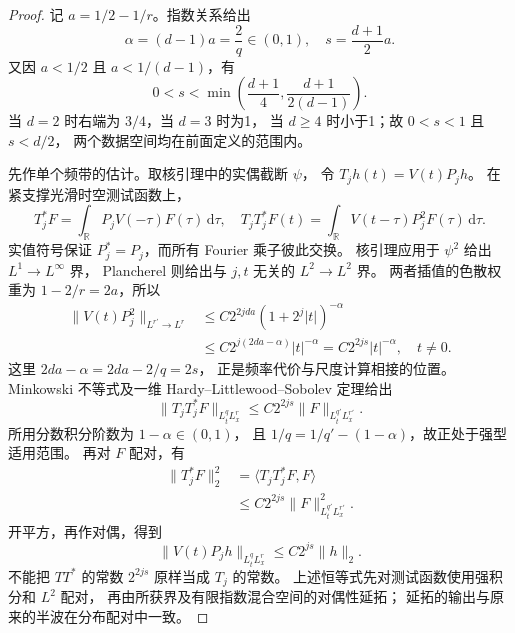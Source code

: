 \begin{proof}
记 \(a=1/2-1/r\)。指数关系给出
\[
 \alpha=(d-1)a=\frac2q\in(0,1),
 \quad
 s=\frac{d+1}{2}a.
\]
又因 \(a<1/2\) 且 \(a<1/(d-1)\)，有
\[
 0<s<\min\left(\frac{d+1}{4},\frac{d+1}{2(d-1)}\right).
\]
当 \(d=2\) 时右端为 \(3/4\)，当 \(d=3\) 时为1，
当 \(d\ge4\) 时小于1；故 \(0<s<1\) 且 \(s<d/2\)，
两个数据空间均在前面定义的范围内。

先作单个频带的估计。取核引理中的实偶截断 \(\psi\)，
令 \(T_jh(t)=V(t)P_jh\)。
在紧支撑光滑时空测试函数上，
\[
 T_j^*F=\int_{\mathbb R}P_jV(-\tau)F(\tau)\,\mathrm d\tau,
 \quad
 T_jT_j^*F(t)=
 \int_{\mathbb R}V(t-\tau)P_j^2F(\tau)\,\mathrm d\tau.
\]
实值符号保证 \(P_j^*=P_j\)，而所有 Fourier 乘子彼此交换。
核引理应用于 \(\psi^2\) 给出 \(L^1\to L^\infty\) 界，
Plancherel 则给出与 \(j,t\) 无关的 \(L^2\to L^2\) 界。
两者插值的色散权重为 \(1-2/r=2a\)，所以
\[
 \begin{aligned}
 \|V(t)P_j^2\|_{L^{r'}\to L^r}
 &\le C2^{2jda}(1+2^j|t|)^{-\alpha}\\
 &\le C2^{j(2da-\alpha)}|t|^{-\alpha}
 =C2^{2js}|t|^{-\alpha},
 \quad t\ne0.
 \end{aligned}
\]
这里 \(2da-\alpha=2da-2/q=2s\)，
正是频率代价与尺度计算相接的位置。
Minkowski 不等式及一维 Hardy--Littlewood--Sobolev 定理给出
\[
 \|T_jT_j^*F\|_{L^q_tL^r_x}
 \le C2^{2js}\|F\|_{L^{q'}_tL^{r'}_x}.
\]
所用分数积分阶数为 \(1-\alpha\in(0,1)\)，
且 \(1/q=1/q'-(1-\alpha)\)，故正处于强型适用范围。
再对 \(F\) 配对，有
\[
 \begin{aligned}
 \|T_j^*F\|_2^2
 &=\langle T_jT_j^*F,F\rangle\\
 &\le C2^{2js}\|F\|_{L^{q'}_tL^{r'}_x}^2.
 \end{aligned}
\]
开平方，再作对偶，得到
\[
 \|V(t)P_jh\|_{L^q_tL^r_x}\le C2^{js}\|h\|_2.
\]
不能把 \(TT^*\) 的常数 \(2^{2js}\) 原样当成 \(T_j\) 的常数。
上述恒等式先对测试函数使用强积分和 \(L^2\) 配对，
再由所获界及有限指数混合空间的对偶性延拓；
延拓的输出与原来的半波在分布配对中一致。


\end{proof}
